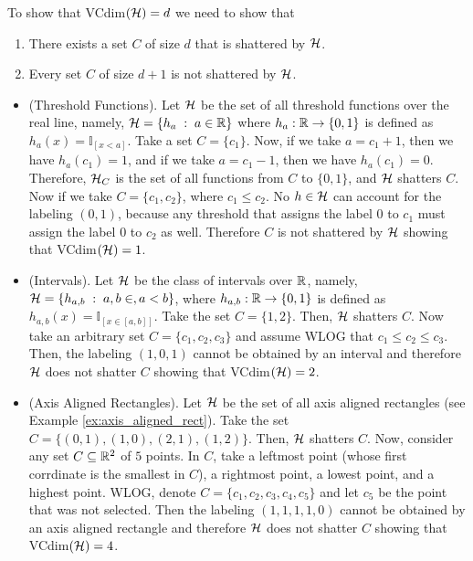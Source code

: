 \documentclass[11pt,a4paper]{article}
\begin{document}
\begin{example}
    To show that VCdim$(\mathcal{H}) = d$ we need to show that
    \begin{enumerate}
        \item There exists a set $C$ of size $d$ that is shattered by $\mathcal{H}$.
        \item Every set $C$ of size $d+1$ is not shattered by $\mathcal{H}$.
    \end{enumerate}
    \begin{itemize}
        \item (Threshold Functions). Let $\mathcal{H}$ be the set of all threshold functions over the real line, namely, $\mathcal{H} = \{h_a\;:\;a\in \mathbb{R}\}$ where $h_a:\mathbb{R}\rightarrow \{0,1\}$ is defined as $h_a(x) = \mathbb{I}_{[x<a]}$. Take a set $C = \{c_1\}$. Now, if we take $a = c_1+1$, then we have $h_a(c_1) = 1$, and if we take $a = c_1-1$, then we have $h_a(c_1) = 0$. Therefore, $\mathcal{H}_C$ is the set of all functions from $C$ to $\{0,1\}$, and $\mathcal{H}$ shatters $C$. Now if we take $C = \{c_1,c_2\}$, where $c_1\le c_2$. No $h\in \mathcal{H}$ can account for the labeling $(0,1)$, because any threshold that assigns the label $0$ to $c_1$ must assign the label $0$ to $c_2$ as well. Therefore $C$ is not shattered by $\mathcal{H}$ showing that VCdim$(\mathcal{H}) = 1$.

        \item (Intervals). Let $\mathcal{H}$ be the class of intervals over $\mathbb{R}$, namely, $\mathcal{H} = \{h_{a,b}\;:\;a,b\in ,a<b\}$, where $h_{a,b}:\mathbb{R}\rightarrow \{0,1\}$ is defined as $h_{a,b}(x) = \mathbb{I}_{[x\in[a,b]]}$. Take the set $C = \{1,2\}$. Then, $\mathcal{H}$ shatters $C$. Now take an arbitrary set $C = \{c_1,c_2,c_3\}$ and assume WLOG that $c_1\le c_2\le c_3$. Then, the labeling $(1,0,1)$ cannot be obtained by an interval and therefore $\mathcal{H}$ does not shatter $C$ showing that VCdim$(\mathcal{H}) = 2$.

        \item (Axis Aligned Rectangles). Let $\mathcal{H}$ be the set of all axis aligned rectangles (see Example \ref{ex:axis_aligned_rect}). Take the set $C = \{(0,1),(1,0),(2,1),(1,2)\}$. Then, $\mathcal{H}$ shatters $C$. Now, consider any set $C\subseteq\mathbb{R}^2$ of $5$ points. In $C$, take a leftmost point (whose first corrdinate is the smallest in $C$), a rightmost point, a lowest point, and a highest point. WLOG, denote $C = \{c_1,c_2,c_3,c_4,c_5\}$ and let $c_5$ be the point that was not selected. Then the labeling $(1,1,1,1,0)$ cannot be obtained by an axis aligned rectangle and therefore $\mathcal{H}$ does not shatter $C$ showing that VCdim$(\mathcal{H}) = 4$.

    \end{itemize}
\end{example}
\end{document}
